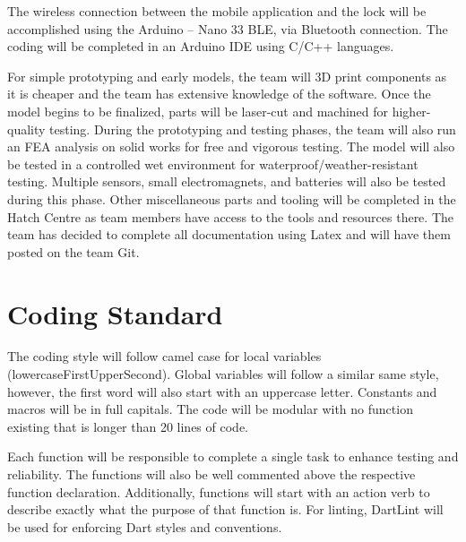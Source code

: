 \documentclass{article}
\begin{document}

The wireless connection between the mobile application and the lock will be accomplished using the Arduino – Nano 33 BLE, via Bluetooth connection.  The coding will be completed in an Arduino IDE using C/C++ languages.

For simple prototyping and early models, the team will 3D print components as it is cheaper and the team has extensive knowledge of the software. Once the model begins to be finalized, parts will be laser-cut and machined for higher-quality testing. During the prototyping and testing phases, the team will also run an FEA analysis on solid works for free and vigorous testing. The model will also be tested in a controlled wet environment for waterproof/weather-resistant testing. Multiple sensors, small electromagnets, and batteries will also be tested during this phase. Other miscellaneous parts and tooling will be completed in the Hatch Centre as team members have access to the tools and resources there. The team has decided to complete all documentation using Latex and will have them posted on the team Git.

\section{Coding Standard}

The coding style will follow camel case for local variables (lowercaseFirstUpperSecond). Global variables will follow a similar same style, however, the first word will also start with an uppercase letter. Constants and macros will be in full capitals. The code will be modular with no function existing that is longer than 20 lines of code. 

Each function will be responsible to complete a single task to enhance testing and reliability. The functions will also be well commented above the respective function declaration. Additionally, functions will start with an action verb to describe exactly what the purpose of that function is. For linting, DartLint will be used for enforcing Dart styles and conventions.
\end{document}
